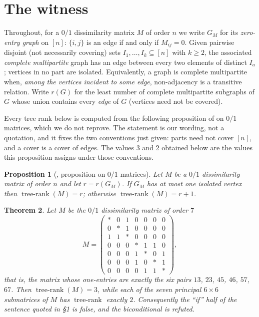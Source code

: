 \documentclass[11pt]{amsart}
\newtheorem{theorem}{Theorem}
\newtheorem{proposition}[theorem]{Proposition}
\theoremstyle{remark}
\DeclareMathOperator{\trank}{tree\text{-}rank}
\newcommand{\GM}{G_M}
\begin{document}
\section{The witness}

Throughout, for a $0/1$ dissimilarity matrix $M$ of order $n$ we write $\GM$ for its
\emph{zero-entry graph} on $[n]$: $\{i,j\}$ is an edge if and only if $M_{ij}=0$. Given
pairwise disjoint (not necessarily covering) sets $I_1,\dots,I_k\subseteq[n]$ with $k\ge2$, the
associated \emph{complete multipartite} graph has an edge between every two elements of
distinct $I_a$; vertices in no part are isolated. Equivalently, a graph is complete
multipartite when, \emph{among the vertices incident to some edge}, non-adjacency is a
transitive relation. Write $r(G)$ for the least number of complete multipartite subgraphs of
$G$ whose union contains every \emph{edge} of $G$ (vertices need not be covered).

Every tree rank below is computed from the following proposition of \cite{CC} on $0/1$ matrices,
which we do not reprove. The statement is our wording, not a quotation, and it fixes the two
conventions just given: parts need not cover $[n]$, and a cover is a cover of edges. The values
$3$ and $2$ obtained below are the values this proposition assigns under those conventions.

\begin{proposition}[\cite{CC}, proposition on $0/1$ matrices]\label{prop:cc}
Let $M$ be a $0/1$ dissimilarity matrix of order $n$ and let $r=r(\GM)$. If $\GM$ has at most
one isolated vertex then $\trank(M)=r$; otherwise $\trank(M)=r+1$.
\end{proposition}

\begin{theorem}\label{thm:main}
Let $M$ be the $0/1$ dissimilarity matrix of order $7$
\[
 M=\begin{pmatrix}
 *&0&1&0&0&0&0\\
 0&*&1&0&0&0&0\\
 1&1&*&0&0&0&0\\
 0&0&0&*&1&1&0\\
 0&0&0&1&*&0&1\\
 0&0&0&1&0&*&1\\
 0&0&0&0&1&1&*
 \end{pmatrix},
\]
that is, the matrix whose one-entries are exactly the six pairs $13$, $23$, $45$, $46$,
$57$, $67$. Then
$\trank(M)=3$, while each of the seven principal $6\times6$ submatrices of $M$ has $\trank$
exactly $2$. Consequently the ``if'' half of the sentence quoted in \S1 is false, and the
biconditional is refuted.
\end{theorem}
\end{document}

